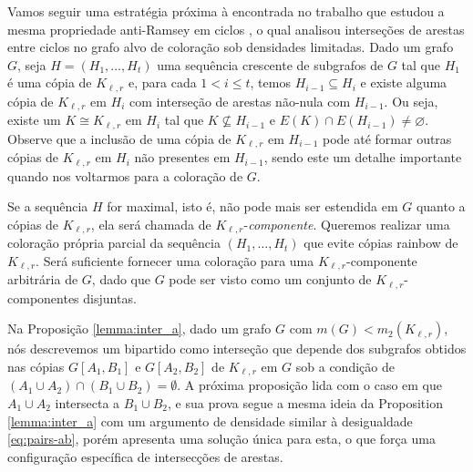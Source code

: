 \documentclass[12pt,a4paper]{book}
\newcommand{\K}{K_{\ell,r}} %
\let\subset\subseteq
\begin{document}
     Vamos seguir uma estratégia próxima à encontrada no trabalho que estudou  a mesma propriedade anti-Ramsey em ciclos \cite{barros2021anti}, o qual analisou interseções de arestas entre ciclos no grafo alvo de coloração sob densidades limitadas.
     Dado um grafo $G$, seja $H = (H_1, \ldots, H_t)$ uma sequência crescente de subgrafos de $G$ tal que
    $H_1$ é uma cópia de $\K$ e, para cada $1 < i \leq t$, temos $H_{i-1} \subseteq H_i$ e existe alguma cópia de $\K$ em $H_{i}$ com interseção de arestas não-nula com $H_{i-1}$. 
    Ou seja, existe um $K \cong \K$ em $H_{i}$ tal que $K \not\subset H_{i-1}$ e $E(K) \cap E(H_{i-1}) \neq\varnothing$.
     Observe que a inclusão de uma cópia de $\K$ em $H_{i-1}$ pode até formar outras cópias de $\K$ em $H_{i}$ não presentes em $H_{i-1}$, sendo este um detalhe importante quando nos voltarmos para a coloração de $G$.
     
     Se a sequência $H$ for maximal, isto é, não pode mais ser estendida em $G$ quanto a cópias de $\K$, ela será chamada de $\K$-\emph{componente}.
     Queremos realizar uma coloração própria parcial da sequência $(H_1, \ldots, H_t)$ que evite cópias  rainbow de $\K$. 
     Será suficiente fornecer uma coloração para uma $\K$-componente arbitrária de $G$, dado que $G$ pode ser visto como um conjunto de $\K$-componentes disjuntas.
 
 Na Proposição \ref{lemma:inter_a}, dado um grafo $G$ com
 $m(G) < m_2(\K)$, nós descrevemos um bipartido como interseção que depende dos subgrafos obtidos nas cópias $G[A_1,B_1]$ e $G[A_2,B_2]$ de $K_{\ell,r}$ em $G$ sob a condição de $(A_1\cup A_2)\cap(B_1\cup B_2) = \emptyset$. %
 A próxima proposição lida com o caso em que $A_1\cup A_2$ intersecta a $B_1\cup B_2$, e sua prova segue a mesma ideia da Proposition \ref{lemma:inter_a} com um argumento de densidade similar à desigualdade \ref{eq:pairs-ab}, porém apresenta uma solução única para esta, o que força uma configuração específica de intersecções de arestas.
\end{document}
